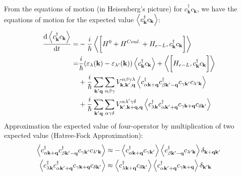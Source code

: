 \documentclass{beamer}
\begin{document}
\begin{frame}
	From the equations of motion (in Heisenberg's picture) for \(c^{\dagger}_{\textbf{k}} c_{\textbf{k}}\), we have the equations of motion for the expected value \(\ev{c^{\dagger}_{\textbf{k}} c_{\textbf{k}}}\):
		\begin{align}
\dv{\ev{c^{\dagger}_{\textbf{k}} c_{\textbf{k}}}}{t} =& -\frac{i}{\hbar}\ev{\bigg[H^0 + H^{Coul.} + H_{e-L},c^{\dagger}_{\textbf{k}} c_{\textbf{k}}\bigg]}\nonumber\\
=& \frac{i}{\hbar}(\varepsilon_{\lambda}(\textbf{k}) - \varepsilon_{\lambda'}(\textbf{k})) \ev{c^{\dagger}_{\textbf{k}} c_{\textbf{k}}} + \ev{\bigg[H_{e-L},c^{\dagger}_{\textbf{k}} c_{\textbf{k}}\bigg]}\nonumber\\
\label{Motions}
&+ \frac{i}{\hbar} \sum_{\textbf{k}'\textbf{q}} \sum_{\alpha\beta\gamma} V^{\alpha\beta\gamma\lambda}_{\textbf{k},\textbf{k}',\textbf{q}} \ev{c^{\dagger}_{\alpha \textbf{k}+\textbf{q}} c^{\dagger}_{\beta\textbf{k}' - \textbf{q}} c_{\gamma \textbf{k}'}c_{\lambda' \textbf{k}}}\\
&+\frac{i}{\hbar} \sum_{\textbf{k}'\textbf{q}} \sum_{\alpha\gamma\delta} V^{\alpha\lambda'\gamma\delta}_{\textbf{k}',\textbf{k} +\textbf{q},\textbf{q}} \ev{c^{\dagger}_{\lambda \textbf{k}} c^{\dagger}_{\alpha\textbf{k}' + \textbf{q}} c_{\gamma \textbf{k}+\textbf{q}}c_{\delta\textbf{k}'}}\nonumber
\end{align}
Approximation the expected value of four-operator by multiplication of two expected value (Hatree-Fock Approximation):
	\begin{align}
		\ev{c^{\dagger}_{\alpha \textbf{k}+\textbf{q}} c^{\dagger}_{\beta\textbf{k}' - \textbf{q}} c_{\gamma \textbf{k}'}c_{\lambda' \textbf{k}}} &\approx-
		\ev{c^{\dagger}_{\alpha \textbf{k} +\textbf{q}}c_{\gamma \textbf{k}'}}\ev{c^{\dagger}_{\beta\textbf{k}'-\textbf{q}}c_{\lambda' \textbf{k}}}\delta_{\textbf{k}+\textbf{q} \textbf{k}'}\nonumber\\\label{HF Approx}
		 \ev{c^{\dagger}_{\lambda \textbf{k}} c^{\dagger}_{\alpha\textbf{k}' + \textbf{q}} c_{\gamma \textbf{k}+\textbf{q}}c_{\delta\textbf{k}'}}&\approx \ev{c^{\dagger}_{\lambda\textbf{k}+\textbf{q}}c_{\delta \textbf{k}'}} \ev{c^{\dagger}_{\alpha \textbf{k}'+\textbf{q}}c_{\gamma \textbf{k}+\textbf{q}}}\delta_{\textbf{k}' \textbf{k}}
	\end{align}
\end{frame}
\end{document}
